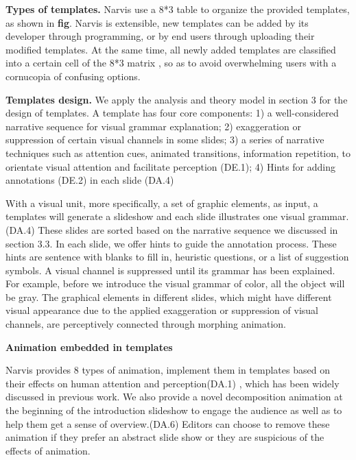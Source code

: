 \textbf{Types of templates.}
Narvis use a 8*3  table to organize the provided templates, as shown in \textbf{fig}. Narvis is extensible, new templates can be added by its developer through programming, or by end users through uploading their modified templates. At the same time, all newly added templates are classified into a certain cell of the 8*3 matrix , so as to avoid overwhelming users with a cornucopia of confusing options.

\textbf{Templates design.}
We apply the analysis and theory model in section 3  for the design of templates. A template has four core components: 1) a well-considered narrative sequence for visual grammar explanation; 2) exaggeration or suppression of certain visual channels in some slides; 3) a series of narrative techniques such as attention cues, animated transitions, information repetition, to orientate visual attention and facilitate perception (DE.1); 4) Hints for adding annotations (DE.2) in each slide (DA.4) 

With a visual unit, more specifically, a set of graphic elements, as input, a templates will generate a slideshow and each slide illustrates one visual grammar.(DA.4)  These slides are sorted based on the narrative sequence we discussed in section 3.3. In each slide, we offer hints to guide the annotation process. These hints are sentence with blanks to fill in, heuristic questions, or a list of suggestion symbols. A visual channel is suppressed until its grammar has been explained. For example, before we introduce the visual grammar of color, all the object will be gray.  The graphical elements in different slides, which might have different visual appearance due to the applied exaggeration or suppression of visual channels, are perceptively connected through morphing animation. 

\textbf{Animation embedded in templates }

Narvis provides 8 types of animation, implement them in templates based on their effects on human attention and perception(DA.1) , which has been widely discussed in previous work.\cite{robertson_effectiveness_2008, waldner_attractive_2014, heer_animated_2007}  We also provide a novel decomposition animation at the beginning of the introduction slideshow to engage the audience as well as to help them get a sense of overview.(DA.6) 
  Editors can choose to remove these animation if they prefer an abstract slide show or they are suspicious of the effects of animation. 

